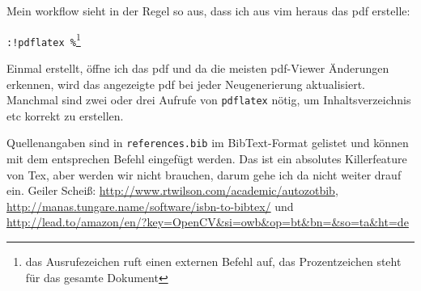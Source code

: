 Mein workflow sieht in der Regel so aus, dass ich aus vim heraus das pdf
erstelle:

\texttt{:!pdflatex \%}\footnote{das Ausrufezeichen ruft einen
externen Befehl auf, das Prozentzeichen steht für das gesamte Dokument}

Einmal erstellt, öffne ich das pdf und da die meisten pdf-Viewer Änderungen
erkennen, wird das angezeigte pdf bei jeder Neugenerierung aktualisiert.
Manchmal sind zwei oder drei Aufrufe von \texttt{pdflatex} nötig, um
Inhaltsverzeichnis etc korrekt zu erstellen.

Quellenangaben sind in \texttt{references.bib} im BibText-Format
\citep{wiki:bibtex} gelistet und können mit dem entsprechen Befehl eingefügt
werden. Das ist ein absolutes Killerfeature von Tex, aber werden wir nicht
brauchen, darum gehe ich da nicht weiter drauf ein. Geiler Scheiß:
\url{http://www.rtwilson.com/academic/autozotbib},
\url{http://manas.tungare.name/software/isbn-to-bibtex/} und
\url{http://lead.to/amazon/en/?key=OpenCV&si=owb&op=bt&bn=&so=ta&ht=de}




